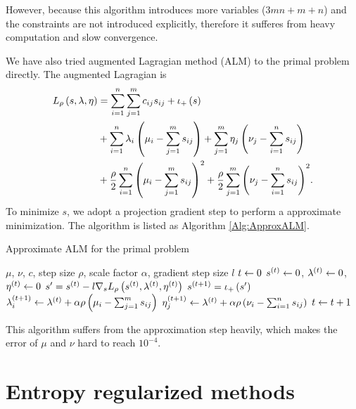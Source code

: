 \documentclass[english]{pkupaper}
\begin{document}
However, because this algorithm introduces more variables ($ 3 m n + m + n $) and the constraints are not introduced explicitly, therefore it sufferes from heavy computation and slow convergence.

We have also tried augmented Lagragian method (ALM) to the primal problem directly. The augmented Lagragian is
\begin{equation}
\begin{aligned}
L_{\rho} \left(  s, \lambda, \eta  \right) &= \sum_{ {i} = {1} }^{n}{\sum_{ {j} = {1} }^{m}{ c_{ i j } s_{ i j } }} + \iota_+ \left( s \right) \\
&+ \sum_{ {i} = {1} }^{n}{ \lambda_i \left(  \mu_i - \sum_{ {j} = {1} }^{m}{s_{ i j }}  \right) } + \sum_{ {j} = {1} }^{m}{ \eta_j \left(  \nu_j - \sum_{ {i} = {1} }^{n}{s_{ i j }}  \right) } \\
&+ \frac{\rho}{2} \sum_{ {i} = {1} }^{n}{\left(  \mu_i - \sum_{ {j} = {1} }^{m}{s_{ i j }}  \right)^2} + \frac{\rho}{2} \sum_{ {j} = {1} }^{m}{\left(  \nu_j - \sum_{ {i} = {1} }^{n}{s_{ i j }}  \right)^2}. \\
\end{aligned}
\end{equation}
To minimize $s$, we adopt a projection gradient step to perform a approximate minimization. The algorithm is listed as Algorithm \ref{Alg:ApproxALM}.

\begin{algorithm}
\caption{Approximate ALM for the primal problem}
\label{Alg:ApproxALM}
\begin{algorithmic}
\REQUIRE $\mu$, $\nu$, $c$, step size $\rho$, scale factor $\alpha$, gradient step size $l$
\STATE $ t \leftarrow 0 $
\STATE $ s^{\left( t \right)} \leftarrow 0 $, $ \lambda^{\left( t \right)} \leftarrow 0 $, $ \eta^{\left( t \right)} \leftarrow 0 $
\STATE $ s' = s^{\left( t \right)} - l \nabla_s L_{\rho} \left(  s^{\left( t \right)}, \lambda^{\left( t \right)}, \eta^{\left( t \right)}  \right) $
\STATE $ s^{\left(  t + 1  \right)} = \iota_+ \left( s' \right) $
\STATE $ \lambda^{\left(  t + 1  \right)}_i \leftarrow \lambda^{\left( t \right)} + \alpha \rho \left(  \mu_i - \sum_{ {j} = {1} }^{m}{s_{ i j }}  \right) $
\STATE $ \eta^{\left(  t + 1  \right)}_j \leftarrow \lambda^{\left( t \right)} + \alpha \rho \left(  \nu_i - \sum_{ {i} = {1} }^{n}{s_{ i j }}  \right) $
\STATE $ t \leftarrow t + 1 $
\ENDWHILE
\end{algorithmic}
\end{algorithm}

This algorithm suffers from the approximation step heavily, which makes the error of $\mu$ and $\nu$ hard to reach $10^{-4}$.

\section{Entropy regularized methods}
\end{document}
